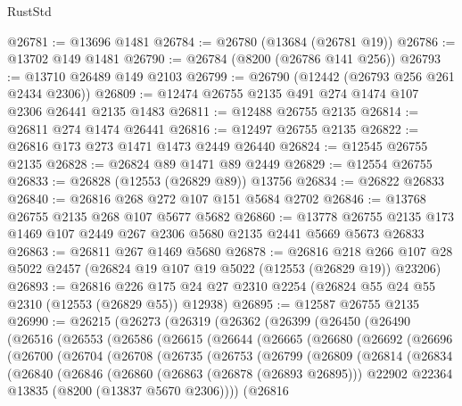 \begin{lexlean}{RustStd}
\begin{coremodule}
@26781 := @13696 @1481
@26784 := @26780 (@13684 (@26781 @19))
@26786 := @13702 @149 @1481
@26790 := @26784 (@8200 (@26786 @141 @256))
@26793 := @13710 @26489 @149 @2103
@26799 := @26790 (@12442 (@26793 @256 @261 @2434 @2306))
@26809 := @12474 @26755 @2135 @491 @274 @1474 @107 @2306 @26441 @2135 @1483
@26811 := @12488 @26755 @2135
@26814 := @26811 @274 @1474 @26441
@26816 := @12497 @26755 @2135
@26822 := @26816 @173 @273 @1471 @1473 @2449 @26440
@26824 := @12545 @26755 @2135
@26828 := @26824 @89 @1471 @89 @2449
@26829 := @12554 @26755
@26833 := @26828 (@12553 (@26829 @89)) @13756
@26834 := @26822 @26833
@26840 := @26816 @268 @272 @107 @151 @5684 @2702
@26846 := @13768 @26755 @2135 @268 @107 @5677 @5682
@26860 := @13778 @26755 @2135 @173 @1469 @107 @2449 @267 @2306 @5680 @2135 @2441 @5669 @5673 @26833
@26863 := @26811 @267 @1469 @5680
@26878 := @26816
    @218
    @266
    @107
    @28
    @5022
    @2457
    (@26824 @19 @107 @19 @5022 (@12553 (@26829 @19)) @23206)
@26893 := @26816
    @226
    @175
    @24
    @27
    @2310
    @2254
    (@26824 @55 @24 @55 @2310 (@12553 (@26829 @55)) @12938)
@26895 := @12587 @26755 @2135
@26990 := @26215
    (@26273
      (@26319
        (@26362
          (@26399
            (@26450
              (@26490
                (@26516
                  (@26553
                    (@26586
                      (@26615
                        (@26644
                          (@26665
                            (@26680
                              (@26692
                                (@26696
                                  (@26700
                                    (@26704
                                      (@26708
                                        (@26735
                                          (@26753
                                            (@26799
                                              (@26809
                                                (@26814
                                                  (@26834
                                                    (@26840
                                                      (@26846
                                                        (@26860
                                                          (@26863 (@26878 (@26893 @26895)))
                                                          @22902
                                                          @22364
                                                          @13835
                                                          (@8200 (@13837 @5670 @2306))))
                                                      (@26816

\end{coremodule}
\end{lexlean}
